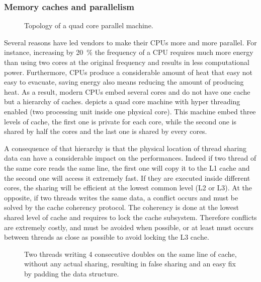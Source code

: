 \subsubsection{Memory caches and parallelism}

\begin{figure}[htb]
    \centering
    
    \caption{Topology of a quad core parallel machine.}
    \label{fig:topo-single}
\end{figure}

Several reasons have led vendors to make their \glspl{CPU} more and more parallel.
For instance, increasing by \SI{20}{\%} the frequency of a \gls{CPU} requires much more energy than using two cores at the original frequency and results in less computational power.
Furthermore, \glspl{CPU} produce a considerable amount of heat that easy not easy to evacuate, saving energy also means reducing the amount of producing heat.
As a result, modern \glspl{CPU} embed several cores and do not have one cache but a hierarchy of caches.
 depicts a quad core machine with hyper threading enabled (two processing unit inside one physical core).
This machine embed three levels of cache, the first one is private for each core, while the second one is shared by half the cores and the last one is shared by every cores.

A consequence of that hierarchy is that the physical location of thread sharing data can have a considerable impact on the performances.
Indeed if two thread of the same core reads the same line, the first one will copy it to the L1 cache and the second one will access it extremely fast.
If they are executed inside different cores, the sharing will be efficient at the lowest common level (L2 or L3).
At the opposite, if two threads writes the same data, a conflict occurs and must be solved by the cache coherency protocol.
The coherency is done at the lowest shared level of cache and requires to lock the cache subsystem.
Therefore conflicts are extremely costly, and must be avoided when possible, or at least must occurs between threads as close as possible to avoid locking the L3 cache.

\begin{figure}[htb]
    \centering
    
    \caption[Example of false sharing.]{Two threads writing 4 consecutive doubles on the same line of cache, without any actual sharing, resulting in false sharing and an easy fix by padding the data structure.}
    \label{fig:false-sharing}
\end{figure}

